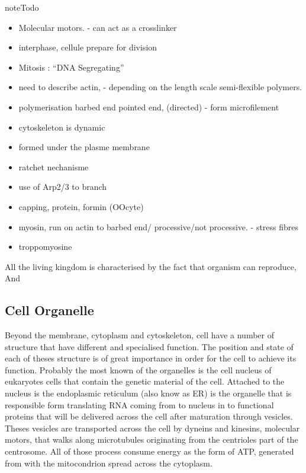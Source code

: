 \documentclass[A4paperpaper,11pt,english]{sphinxmanual}
\begin{document}
\begin{notice}{note}{Todo}
\begin{itemize}
\item {} 
Molecular motors.
- can act as a crosslinker

\item {} 
interphase, cellule prepare for division

\item {} 
Mitosis : ``DNA Segregating''

\item {} 
need to describe actin,
- depending on the length scale semi-flexible polymers.

\item {} 
polymerisation barbed end pointed end, (directed)
- form microfilement

\item {} 
cytoskeleton is dynamic

\item {} 
formed under the plasme membrane

\item {} 
ratchet nechanisme

\item {} 
use of Arp2/3 to branch

\item {} 
capping, protein,  formin (OOcyte)

\item {} 
myosin, run on actin to barbed end/ processive/not processive.
- stress fibres

\item {} 
troppomyosine

\end{itemize}
\end{notice}

All the living kingdom is characterised by the fact that organism can reproduce,
And


\subsection{Cell Organelle}
\label{parts/part1:cell-organelle}
Beyond the membrane, cytoplasm and cytoskeleton, cell have a number of
structure that have different and specialised function. The position and
state of each of theses structure is of great importance in order for the
cell to achieve its function. Probably the most known of the organelles is
the cell nucleus of eukaryotes cells that contain the genetic material of the
cell. Attached to the nucleus is the endoplasmic reticulum (also know as ER)
is the organelle that is responsible form translating RNA coming from to
nucleus in to functional proteins that will be delivered across the cell
after maturation through vesicles. Theses vesicles are transported across the
cell by dyneins and kinesins, molecular motors, that walks along microtubules
originating from the centrioles part of the centrosome. All of those process
consume energy as the form of ATP, generated from with the mitocondrion spread
across the cytoplasm.
\end{document}
